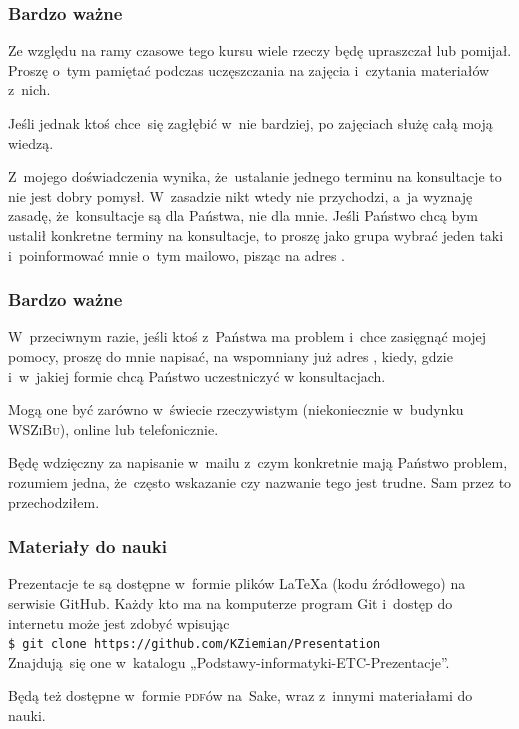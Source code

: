 \documentclass[10pt,t]{beamer}
\begin{document}
\begin{frame}
  \frametitle{Bardzo ważne}


  Ze względu na ramy czasowe tego kursu wiele rzeczy będę
  \alert{upraszczał} lub \alert{pomijał}. Proszę o~tym pamiętać podczas
  uczęszczania na zajęcia i~czytania materiałów z~nich.

  Jeśli jednak ktoś chce~się zagłębić w~nie bardziej, po zajęciach służę
  całą moją wiedzą.

  Z~mojego doświadczenia wynika, że~ustalanie jednego terminu na konsultacje
  to nie jest dobry pomysł. W~zasadzie nikt wtedy nie przychodzi, a~ja
  wyznaję zasadę, że~konsultacje są dla Państwa, nie dla mnie. Jeśli
  Państwo chcą bym ustalił konkretne terminy na konsultacje, to proszę jako
  grupa wybrać jeden taki i~poinformować mnie o~tym mailowo, pisząc na
  adres \email.

\end{frame}





\begin{frame}
  \frametitle{Bardzo ważne}


  W~przeciwnym razie, jeśli ktoś z~Państwa ma problem i~chce zasięgnąć
  mojej pomocy, proszę do mnie napisać, na wspomniany już adres \email,
  kiedy, gdzie i~w~jakiej formie chcą Państwo uczestniczyć w konsultacjach.

  Mogą one być zarówno w~świecie rzeczywistym (niekoniecznie w~budynku
  \textsc{WSZiBu}), online lub telefonicznie.

  Będę wdzięczny za napisanie w~mailu z~czym konkretnie mają Państwo
  problem, rozumiem jedna, że~często wskazanie czy nazwanie tego jest
  trudne. Sam przez to przechodziłem.

\end{frame}





\begin{frame}
  \frametitle{Materiały do nauki}


  Prezentacje te są dostępne w~formie plików \LaTeX a (kodu źródłowego)
  na serwisie GitHub. Każdy kto ma na komputerze program Git i~dostęp
  do internetu może jest zdobyć wpisując \\
  \texttt{\$ git clone https://github.com/KZiemian/Presentation} \\
  Znajdują~się one w~katalogu „Podstawy-informatyki-ETC-Prezentacje”.

  Będą też dostępne w~formie \textsc{pdf}ów na~Sake, wraz z~innymi
  materiałami do nauki.

\end{frame}
\end{document}
